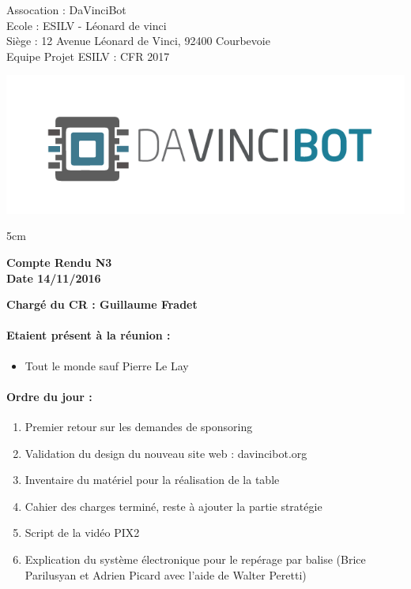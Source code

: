 \documentclass[12pt]{report}
\begin{document}
\begin{minipage}{0.55\linewidth}
\noindent Assocation : DaVinciBot\\
Ecole : ESILV - Léonard de vinci\\
Siège :  12 Avenue Léonard de Vinci, 92400 Courbevoie\\
Equipe Projet ESILV : CFR 2017\\
\end{minipage}\hfill
\begin{minipage}{0.3\linewidth}
\includegraphics[scale = 0.2]{img/logo_assos.png}
\end{minipage}
\vspace{1cm}



\begin{center}
\begin {boxedminipage} [ poslb ] { 5cm}
\begin{center}
\textbf{Compte Rendu N3}\\
\textbf{Date 14/11/2016}
\end{center}
\end {boxedminipage}
\end{center}
\textbf{Chargé du CR : Guillaume Fradet}

\vspace{1cm}

\paragraph{Etaient présent à la réunion :}
\begin{itemize}
\item Tout le monde sauf Pierre Le Lay
\end{itemize}


\paragraph{Ordre du jour :}
\begin{enumerate}
 \item Premier retour sur les demandes de sponsoring 
 \item Validation du design du nouveau site web : davincibot.org
 \item Inventaire du matériel pour la réalisation de la table  
 \item Cahier des charges terminé, reste à ajouter la partie stratégie
 \item Script de la vidéo PIX2 
 \item Explication du système électronique pour le repérage par balise (Brice Parilusyan et Adrien Picard avec l'aide de Walter Peretti)  
\end{enumerate}
\end{document}
